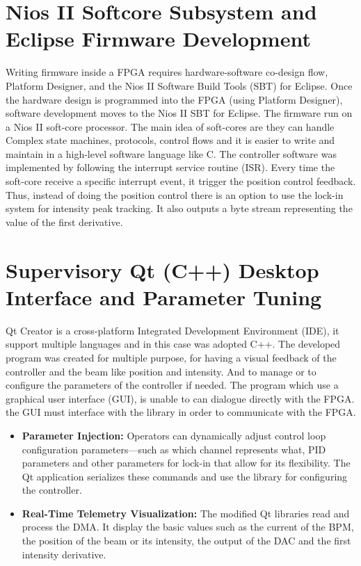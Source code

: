 \section{Nios II Softcore Subsystem and Eclipse Firmware Development}

Writing firmware inside a FPGA requires hardware-software co-design flow, Platform Designer, and the Nios II Software Build Tools (SBT) for Eclipse.
Once the hardware design is programmed into the FPGA (using Platform Designer), software development moves to the Nios II SBT for Eclipse.
The firmware run on a Nios II soft-core processor.
The main idea of soft-cores are they can handle Complex state machines, protocols, control flows and it is easier to write and maintain in a high-level software language like C.
The controller software was implemented by following the interrupt service routine (ISR).
Every time the soft-core receive a specific interrupt event, it trigger the position control feedback.
Thus, instead of doing the position control there is an option to use the lock-in system for intensity peak tracking.
It also outputs a byte stream representing the value of the first derivative.

\section{Supervisory Qt (C++) Desktop Interface and Parameter Tuning}
Qt Creator is a cross-platform Integrated Development Environment (IDE), it support multiple languages and in this case was adopted C++.
The developed program was created for multiple purpose, for having a visual feedback of the controller and the beam like position and intensity. 
And to manage or to configure the parameters of the controller if needed.
The program which use a graphical user interface (GUI), is unable to can dialogue directly with the FPGA.
the GUI must interface with the library in order to communicate with the FPGA.
\begin{itemize}
    \item \textbf{Parameter Injection:} Operators can dynamically adjust control loop configuration parameters—such as which channel represents what, PID parameters and other parameters for lock-in that allow for its flexibility. The Qt application serializes these commands and use the library for configuring the controller.
    \item \textbf{Real-Time Telemetry Visualization:} The modified Qt libraries read and process the DMA. It display the basic values such as the current of the BPM, the position of the beam or its intensity, the output of the DAC and the first intensity derivative.  
\end{itemize}

